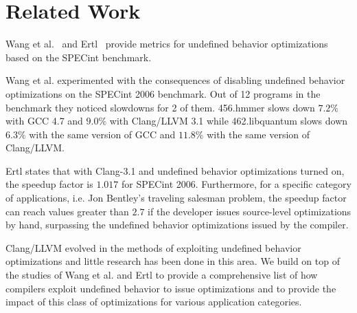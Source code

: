 \section{Related Work} \label{sec:rl}

Wang et al.~\cite{wang2012undefined} and Ertl~\cite{ertl2015every}
provide metrics for undefined behavior optimizations based on the
SPECint benchmark.

Wang et al. experimented with the consequences of disabling undefined
behavior optimizations on the SPECint 2006 benchmark. Out of 12 programs
in the benchmark they noticed slowdowns for 2 of them. 456.hmmer slows
down $7.2\%$ with GCC 4.7 and $9.0\%$ with Clang/LLVM 3.1 while
462.libquantum slows down $6.3\%$ with the same version of GCC and
$11.8\%$ with the same version of Clang/LLVM.

Ertl states that with Clang-3.1 and undefined behavior optimizations
turned on, the speedup factor is $1.017$ for SPECint 2006. Furthermore,
for a specific category of applications, i.e. Jon Bentley's traveling
salesman problem, the speedup factor can reach values greater than $2.7$
if the developer issues source-level optimizations by hand, surpassing
the undefined behavior optimizations issued by the compiler.

Clang/LLVM evolved in the methods of exploiting undefined behavior
optimizations and little research has been done in this area. We build
on top of the studies of Wang et al. and Ertl to provide a comprehensive
list of how compilers exploit undefined behavior to issue optimizations
and to provide the impact of this class of optimizations for various
application categories.
